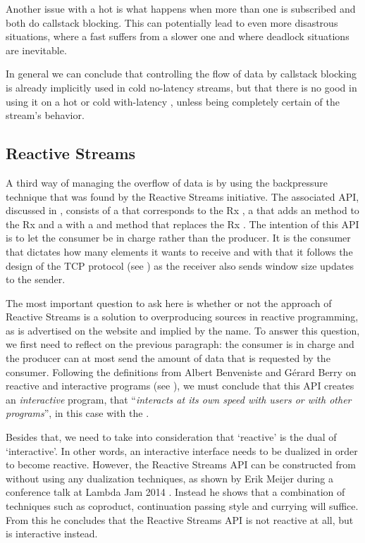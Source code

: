 Another issue with a hot \obs is what happens when more than one \obv is subscribed and both do callstack blocking. This can potentially lead to even more disastrous situations, where a fast \obv suffers from a slower one and where deadlock situations are inevitable.

In general we can conclude that controlling the flow of data by callstack blocking is already implicitly used in cold no-latency streams, but that there is no good in using it on a hot or cold with-latency \obs, unless being completely certain of the stream's behavior.

\subsection{Reactive Streams}
\label{subsec:handling-overproduction-with-reactive-streams}
A third way of managing the overflow of data is by using the backpressure technique that was found by the Reactive Streams initiative. The associated API, discussed in , consists of a  that corresponds to the Rx \obs, a  that adds an  method to the Rx \obv and a  with a  and  method that replaces the Rx \subs. The intention of this API is to let the consumer be in charge rather than the producer. It is the consumer that dictates how many elements it wants to receive and with that it follows the design of the TCP protocol (see ) as the receiver also sends window size updates to the sender.

The most important question to ask here is whether or not the approach of Reactive Streams is a solution to overproducing sources in reactive programming, as is advertised on the website \cite{Reactive-Streams} and implied by the name. To answer this question, we first need to reflect on the previous paragraph: the consumer is in charge and the producer can at most send the amount of data that is requested by the consumer. Following the definitions from Albert Benveniste and G\'erard Berry \cite{berry1991-Reactive} on reactive and interactive programs (see ), we must conclude that this API creates an \emph{interactive} program, that ``\textit{interacts at its own speed with users or with other programs}'', in this case with the .

Besides that, we need to take into consideration that `reactive' is the dual of `interactive'. In other words, an interactive interface needs to be dualized in order to become reactive. However, the Reactive Streams API can be constructed from \ieb without using any dualization techniques, as shown by Erik Meijer during a conference talk at Lambda Jam 2014 \cite{meijer2014-Derivation}. Instead he shows that a combination of techniques such as coproduct, continuation passing style and currying will suffice. From this he concludes that the Reactive Streams API is not reactive at all, but is interactive instead.

